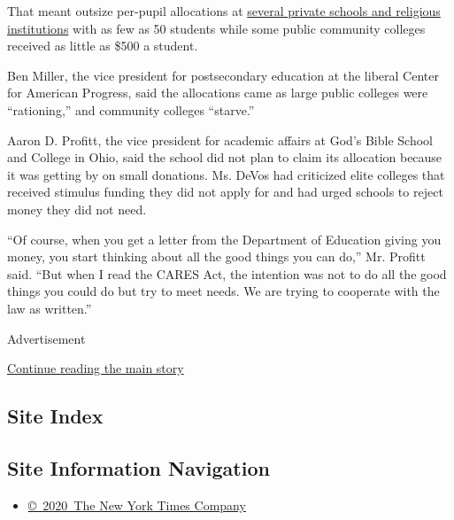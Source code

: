 That meant outsize per-pupil allocations at
\href{https://www2.ed.gov/about/offices/list/ope/allocationsfipse.pdf}{several
private schools and religious institutions} with as few as 50 students
while some public community colleges received as little as \$500 a
student.

Ben Miller, the vice president for postsecondary education at the
liberal Center for American Progress, said the allocations came as large
public colleges were ``rationing,'' and community colleges ``starve.''

Aaron D. Profitt, the vice president for academic affairs at God's Bible
School and College in Ohio, said the school did not plan to claim its
allocation because it was getting by on small donations. Ms. DeVos had
criticized elite colleges that received stimulus funding they did not
apply for and had urged schools to reject money they did not need.

``Of course, when you get a letter from the Department of Education
giving you money, you start thinking about all the good things you can
do,'' Mr. Profitt said. ``But when I read the CARES Act, the intention
was not to do all the good things you could do but try to meet needs. We
are trying to cooperate with the law as written.''

Advertisement

\protect\hyperlink{after-bottom}{Continue reading the main story}

\hypertarget{site-index}{%
\subsection{Site Index}\label{site-index}}

\hypertarget{site-information-navigation}{%
\subsection{Site Information
Navigation}\label{site-information-navigation}}

\begin{itemize}
\tightlist
\item
  \href{https://help.nytimes3xbfgragh.onion/hc/en-us/articles/115014792127-Copyright-notice}{©~2020~The
  New York Times Company}
\end{itemize}

